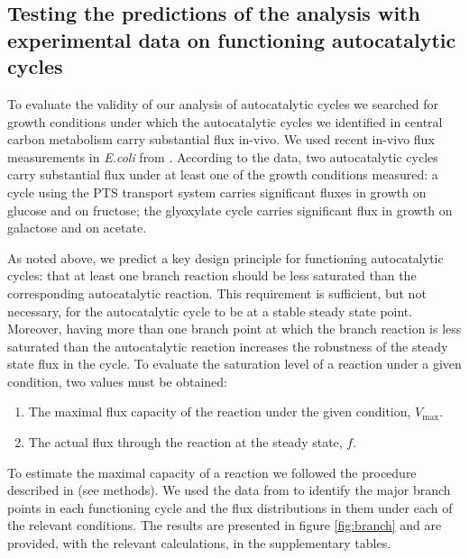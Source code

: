     \subsection{Testing the predictions of the analysis with experimental data on functioning autocatalytic cycles}
    To evaluate the validity of our analysis of autocatalytic cycles we searched for growth conditions under which the autocatalytic cycles we identified in central carbon metabolism carry substantial flux in-vivo.
    We used recent in-vivo flux measurements in \emph{E.coli} from \cite{Gerosa2015-oq}.
    According to the data, two autocatalytic cycles carry substantial flux under at least one of the growth conditions measured:
    a cycle using the PTS transport system carries significant fluxes in growth on glucose and on fructose;
    the glyoxylate cycle carries significant flux in growth on galactose and on acetate.

    As noted above, we predict a key design principle for functioning autocatalytic cycles: that at least one branch reaction should be less saturated than the corresponding autocatalytic reaction.
    This requirement is sufficient, but not necessary, for the autocatalytic cycle to be at a stable steady state point.
    Moreover, having more than one branch point at which the branch reaction is less saturated than the autocatalytic reaction increases the robustness of the steady state flux in the cycle.
    To evaluate the saturation level of a reaction under a given condition, two values must be obtained:
    \begin{enumerate}
      \item The maximal flux capacity of the reaction under the given condition, $V_{\max}$.
        \item The actual flux through the reaction at the steady state, $f$.
    \end{enumerate}

    To estimate the maximal capacity of a reaction we followed the procedure described in \cite{Davidi2016-ga} (see methods).
    We used the data from \cite{Gerosa2015-oq} to identify the major branch points in each functioning cycle and the flux distributions in them under each of the relevant conditions.
    The results are presented in figure \ref{fig:branch} and are provided, with the relevant calculations, in the supplementary tables.

